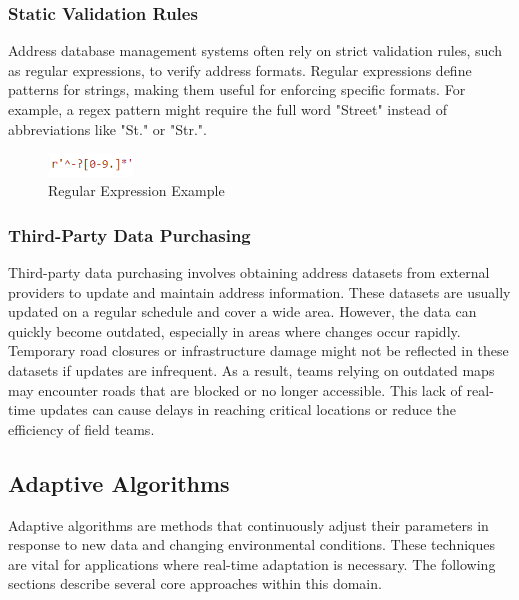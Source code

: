         \subsubsection{Static Validation Rules}
        Address database management systems often rely on strict validation rules, such as regular expressions, to verify address formats. Regular expressions define patterns for strings, making them useful for enforcing specific formats. For example, a regex pattern might require the full word "Street" instead of abbreviations like "St." or "Str.". \autocite{AutorenderWikimedia-Projekte2002Jul}


        \begin{figure}[H]
            \centering
            \includegraphics[width=0.2\textwidth]{images/AdminPanel/regexInputFormatter.png}
            \caption{Regular Expression Example}
            \label{fig:regex}
        \end{figure}



        \subsubsection{Third-Party Data Purchasing}
        Third-party data purchasing involves obtaining address datasets from external providers to update and maintain address information. These datasets are usually updated on a regular schedule and cover a wide area. However, the data can quickly become outdated, especially in areas where changes occur rapidly.\\

        Temporary road closures or infrastructure damage might not be reflected in these datasets if updates are infrequent. As a result, teams relying on outdated maps may encounter roads that are blocked or no longer accessible. This lack of real-time updates can cause delays in reaching critical locations or reduce the efficiency of field teams.


    \subsection{Adaptive Algorithms}
    Adaptive algorithms are methods that continuously adjust their parameters in response to new data and changing environmental conditions. These techniques are vital for applications where real-time adaptation is necessary. The following sections describe several core approaches within this domain. \autocite{AdaptiveWikimediaprojects2024Aug}


